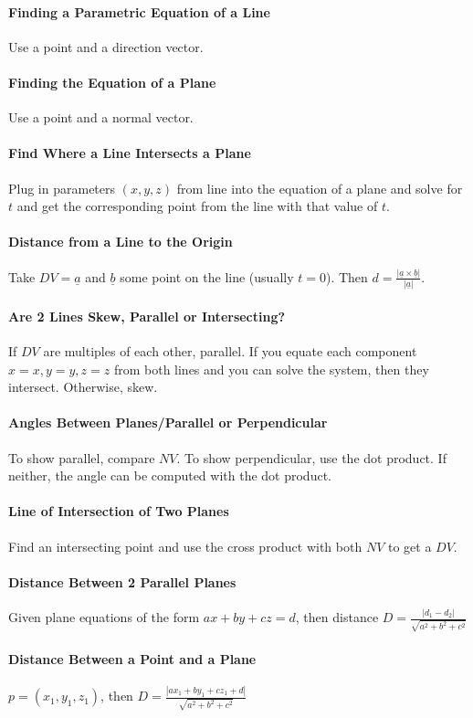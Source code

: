 \documentclass[12 pt]{article}
\theoremstyle{definition}
\begin{document}
\paragraph{Finding a Parametric Equation of a Line} Use a point and a direction vector.
\paragraph{Finding the Equation of a Plane} Use a point and a normal vector.
\paragraph{Find Where a Line Intersects a Plane} Plug in parameters $(x,y,z)$ from line into the equation of a plane and solve for $t$ and get the corresponding point from the line with that value of $t$.
\paragraph{Distance from a Line to the Origin} Take $DV=\underline{a}$ and $\underline{b}$ some point on the line (usually $t=0$). Then $d=\frac{|\underline{a}\times \underline{b}|}{|\underline{a}|}$.
\paragraph{Are 2 Lines Skew, Parallel or Intersecting?} If $DV$ are multiples of each other, parallel. If you equate each component $x=x,y=y,z=z$ from both lines and you can solve the system, then they intersect. Otherwise, skew.
\paragraph{Angles Between Planes/Parallel or Perpendicular} To show parallel, compare $NV$. To show perpendicular, use the dot product. If neither, the angle can be computed with the dot product.
\paragraph{Line of Intersection of Two Planes} Find an intersecting point and use the cross product with both $NV$ to get a $DV$.  
\paragraph{Distance Between 2 Parallel Planes} Given plane equations of the form $ax+by+cz=d$, then distance $D=\frac{|d_1-d_2|}{\sqrt{a^2+b^2+c^2}}$
\paragraph{Distance Between a Point and a Plane} $p=(x_1,y_1,z_1)$, then $D=\frac{|ax_1+by_1+cz_1+d|}{\sqrt{a^2+b^2+c^2}}$
\end{document}

